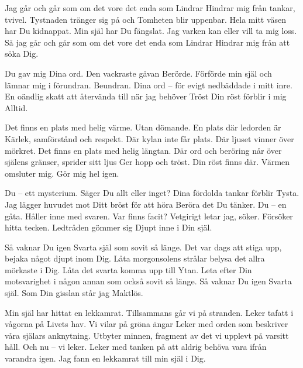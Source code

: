 \startpoem
Jag går och går
som om det vore det enda som
Lindrar
Hindrar mig från tankar,
tvivel.
Tystnaden tränger sig på och
Tomheten blir uppenbar.
Hela mitt väsen har Du kidnappat.
Min själ har Du fängslat.
Jag varken kan eller vill ta mig loss.
Så jag går och går
som om det vore det enda som
Lindrar
Hindrar mig från att söka
Dig.
\stoppoem

\startpoem
Du gav mig Dina ord.
Den vackraste gåvan
Berörde.
Förförde min själ 
och lämnar mig i förundran.
Beundran.
Dina ord – för evigt nedbäddade
i mitt inre.
En oändlig skatt att 
återvända till när jag behöver
Tröst
Din röst förblir i mig
Alltid.
\stoppoem

\startpoem
Det finns en plats med helig värme.
Utan dömande.
En plats där ledorden är
Kärlek, samförstånd och respekt.
Där kylan inte får plats.
Där ljuset vinner över mörkret.
Det finns en plats med helig längtan.
Där ord och beröring når över själens gränser,
sprider sitt ljus
Ger hopp och tröst.
Din röst finns där.
Värmen omsluter mig.
Gör mig hel igen.
\stoppoem

\startpoem
Du – ett mysterium.
Säger Du allt eller inget?
Dina fördolda tankar förblir
Tysta.
Jag lägger huvudet mot Ditt bröst
för att höra
Beröra det Du tänker.
Du – en gåta.
Håller inne med svaren.
Var finns facit?
Vetgirigt letar jag,
söker.
Försöker hitta tecken.
Ledtråden gömmer sig
Djupt inne i Din själ. 
\stoppoem

\startpoem
Så vaknar Du igen
Svarta själ
som sovit så länge.
Det var dags att stiga upp,
bejaka något djupt inom Dig.
Låta morgonsolens strålar belysa
det allra mörkaste i Dig.
Låta det svarta komma upp till 
Ytan.
Leta efter Din motsvarighet i någon annan
som också sovit så länge. 
Så vaknar Du igen
Svarta själ.
Som Din gisslan står jag
Maktlös.
\stoppoem

\startpoem
Min själ har hittat en lekkamrat.
Tillsammans går vi på stranden.
Leker tafatt i vågorna på Livets hav.
Vi vilar på gröna ängar
Leker med orden som beskriver
våra själars anknytning.
Utbyter minnen, fragment av det vi upplevt
på varsitt håll.
Och nu – vi leker.
Leker med tanken på att aldrig behöva
vara ifrån varandra igen.
Jag fann en lekkamrat till min själ
i Dig.
\stoppoem

